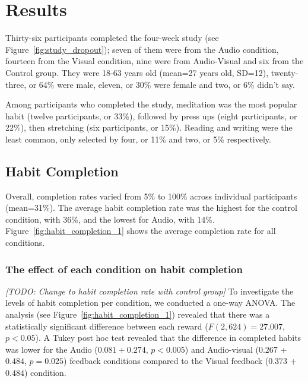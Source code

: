 \documentclass{scaffold/sigchi}
\begin{document}
\section{Results}
Thirty-six participants completed the four-week study (see Figure~\ref{fig:study_dropout}); seven of them were from the Audio condition, fourteen from the Visual condition, nine were from Audio-Visual and six from the Control group. They were 18-63 years old (mean=27 years old, SD=12), twenty-three, or 64\% were male, eleven, or 30\% were female and two, or 6\% didn't say. 

Among participants who completed the study, meditation was the most popular habit (twelve participants, or 33\%), followed by press ups (eight participants, or 22\%), then stretching (six participants, or 15\%). Reading and writing were the least common, only selected by four, or 11\% and two, or 5\% respectively.

\subsection{Habit Completion}
Overall, completion rates varied from 5\% to 100\% across individual participants (mean=31\%). The average habit completion rate was the highest for the control condition, with 36\%, and the lowest for Audio, with 14\%. Figure~\ref{fig:habit_completion_1} shows the average completion rate for all conditions.

\subsubsection{The effect of each condition on habit completion}
 \emph{[TODO: Change to habit completion rate with control group]}
To investigate the levels of habit completion per condition, we conducted a one-way ANOVA. The analysis (see Figure~\ref{fig:habit_completion_1}) revealed that there was a statistically significant difference between each reward ($F(2,624) = 27.007$, $p < 0.05$). A Tukey post hoc test revealed that the difference in completed habits was lower for the Audio ($0.081 + 0.274$, $p < 0.005$) and Audio-visual ($0.267$ + $0.484$, $p = 0.025$) feedback conditions compared to the Visual feedback ($0.373$ + $0.484$) condition.
\end{document}
